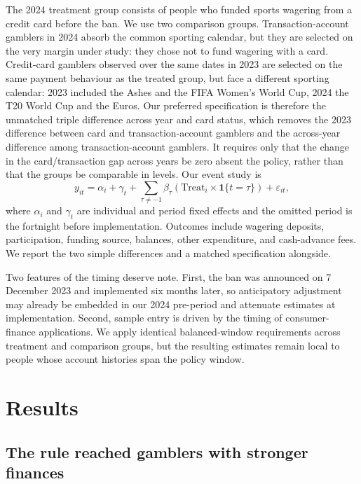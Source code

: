 \documentclass[12pt]{article}
\begin{document}
The 2024 treatment group consists of people who funded sports wagering from a credit card before the ban. We use two comparison groups. Transaction-account gamblers in 2024 absorb the common sporting calendar, but they are selected on the very margin under study: they chose not to fund wagering with a card. Credit-card gamblers observed over the same dates in 2023 are selected on the same payment behaviour as the treated group, but face a different sporting calendar: 2023 included the Ashes and the FIFA Women's World Cup, 2024 the T20 World Cup and the Euros. Our preferred specification is therefore the unmatched triple difference across year and card status, which removes the 2023 difference between card and transaction-account gamblers and the across-year difference among transaction-account gamblers. It requires only that the change in the card/transaction gap across years be zero absent the policy, rather than that the groups be comparable in levels. Our event study is
\begin{equation}\label{eq:eventstudy}
    y_{it}=\alpha_i+\gamma_t+\sum_{\tau\ne-1}\beta_{\tau}
    \left(\mathrm{Treat}_i\times\mathbf{1}\{t=\tau\}\right)+\varepsilon_{it},
\end{equation}
where $\alpha_i$ and $\gamma_t$ are individual and period fixed effects and the omitted period is the fortnight before implementation. Outcomes include wagering deposits, participation, funding source, balances, other expenditure, and cash-advance fees. We report the two simple differences and a matched specification alongside.

Two features of the timing deserve note. First, the ban was announced on 7 December 2023 and implemented six months later, so anticipatory adjustment may already be embedded in our 2024 pre-period and attenuate estimates at implementation. Second, sample entry is driven by the timing of consumer-finance applications. We apply identical balanced-window requirements across treatment and comparison groups, but the resulting estimates remain local to people whose account histories span the policy window.

\section{Results}\label{sec:results}

\subsection{The rule reached gamblers with stronger finances}\label{sec:composition}
\end{document}
